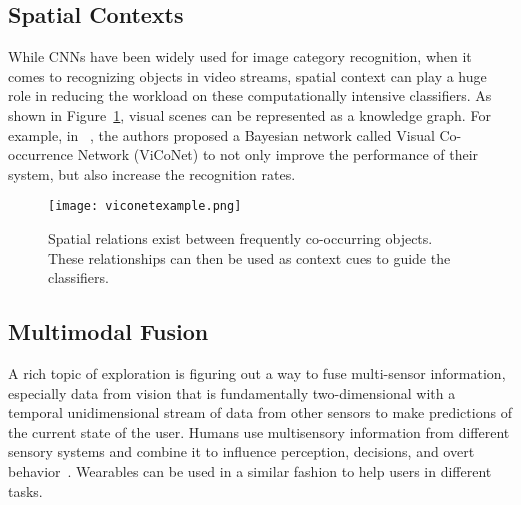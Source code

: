 \subsection{Spatial Contexts}
While CNNs have been widely used for image category recognition, when it comes to recognizing objects in video streams, spatial context can play a huge role in 
reducing the workload on these computationally intensive classifiers. As shown in Figure~\ref{fig:viconet}, visual scenes can be represented as a knowledge graph.   
For example, in ~\cite{estimedia2015}, the authors proposed a Bayesian network called Visual Co-occurrence Network (ViCoNet) to not only improve the performance of their system, but also increase the recognition rates.

\begin{figure}[!htb]
\centering
\texttt{[image: viconetexample.png]}
\caption{Spatial relations exist between frequently co-occurring objects. These relationships can then be used as context cues to guide the classifiers.}
\label{fig:viconet}
\end{figure} 

\subsection{Multimodal Fusion}
A rich topic of exploration is figuring out a way to fuse multi-sensor information, especially data from vision that is fundamentally two-dimensional with a temporal 
unidimensional stream of data from other sensors to make predictions of the current state of the user. 
Humans use multisensory information from different sensory systems and combine it to influence 
perception, decisions, and overt behavior~\cite{stein2009neural}. Wearables can be used in a similar fashion to help users in different tasks. 
